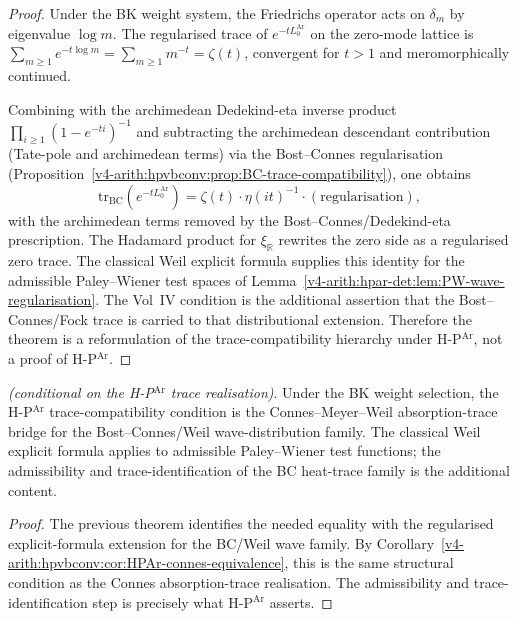\begin{proof}
Under the BK weight system, the Friedrichs operator acts on
\(\delta_{m}\) by eigenvalue \(\log m\). The regularised trace of
\(e^{-tL_{0}^{\mathrm{Ar}}}\) on the zero-mode lattice is
\(\sum_{m\geq 1}e^{-t\log m}=\sum_{m\geq 1}m^{-t}=\zeta(t)\), convergent
for \(t>1\) and meromorphically continued.

Combining with the archimedean Dedekind-eta inverse product
\(\prod_{i\geq 1}(1-e^{-ti})^{-1}\) and subtracting the archimedean
descendant contribution (Tate-pole and archimedean terms) via the
Bost--Connes regularisation
(Proposition~\ref{v4-arith:hpvbconv:prop:BC-trace-compatibility}), one obtains
\begin{equation*}
\mathrm{tr}_{\mathrm{BC}}(e^{-tL_{0}^{\mathrm{Ar}}})
=\zeta(t)\cdot\eta(it)^{-1}\cdot(\text{regularisation}),
\end{equation*}
with the archimedean terms removed by the Bost--Connes/Dedekind-eta
prescription. The Hadamard product for \(\xi_{\mathbb R}\) rewrites
the zero side as a regularised zero trace. The classical Weil explicit
formula supplies this identity for the admissible Paley--Wiener test
spaces of Lemma~\ref{v4-arith:hpar-det:lem:PW-wave-regularisation}. The
Vol~IV condition is the additional assertion that the
Bost--Connes/Fock trace is carried to that distributional extension.
Therefore the theorem is a reformulation of the trace-compatibility
hierarchy under H-P\(^{\mathrm{Ar}}\), not a proof of
H-P\(^{\mathrm{Ar}}\).
\end{proof}

\begin{corollary}
\label{v4-arith:hpar-det:cor:hierarchy-is-weil}
\ClaimStatusProvedHere \emph{(conditional on the H-P\(^{\mathrm{Ar}}\)
trace realisation)}. Under the BK weight selection, the
H-P\(^{\mathrm{Ar}}\) trace-compatibility condition is the
Connes--Meyer--Weil absorption-trace bridge for the
Bost--Connes/Weil wave-distribution family. The classical Weil explicit
formula applies to admissible Paley--Wiener test functions; the
admissibility and trace-identification of the BC heat-trace family is
the additional content.
\end{corollary}

\begin{proof}
The previous theorem identifies the needed equality with the
regularised explicit-formula extension for the BC/Weil wave family.
By Corollary~\ref{v4-arith:hpvbconv:cor:HPAr-connes-equivalence}, this is the
same structural condition as the Connes absorption-trace
realisation. The admissibility and trace-identification step is
precisely what H-P\(^{\mathrm{Ar}}\) asserts.
\end{proof}

